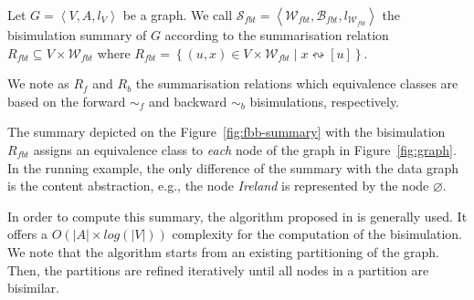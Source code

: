 \begin{definition}
Let $G=\left\langle V, A, l_V \right\rangle$ be a graph. We call $\mathcal{S}_{fbt} = \left\langle \mathcal{W}_{fbt}, \mathcal{B}_{fbt}, l_{\mathcal{W}_{fbt}} \right\rangle$ the bisimulation summary of $G$ according to the summarisation relation $R_{fbt} \subseteq V \times \mathcal{W}_{fbt}$ where $R_{fbt} = \left\lbrace \left( u, x \right) \in V \times \mathcal{W}_{fbt} \mid x \leftrightsquigarrow [u] \right\rbrace$.
\end{definition}

\begin{remark}
We note as $R_f$ and $R_b$ the summarisation relations which equivalence classes are based on the forward $\sim_f$ and backward $\sim_b$ bisimulations, respectively.
\end{remark}

The summary depicted on the Figure~\ref{fig:fbb-summary} with the bisimulation $R_{fbt}$ assigns an equivalence class to \emph{each} node of the graph in Figure~\ref{fig:graph}. In the running example, the only difference of the summary with the data graph is the content abstraction, e.g., the node \emph{Ireland} is represented by the node $\varnothing$.

In order to compute this summary, the algorithm proposed in \cite{Paige:1987:TPR:37185.37186} is generally used. It offers a $O\left( \vert A \vert \times log\left( \vert V \vert \right) \right)$ complexity for the computation of the bisimulation. We note that the algorithm starts from an existing partitioning of the graph. Then, the partitions are refined iteratively until all nodes in a partition are bisimilar.%

